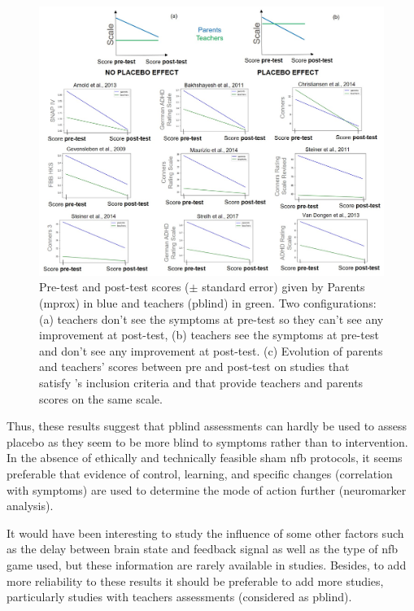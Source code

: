 \begin{figure}[h!]
  \centering
  \includegraphics[width=1.0\linewidth]{figures/discussion_on_placebo_effect_colors_2-columns_fitting_image}
  \caption{Pre-test and post-test scores ($\pm$ standard error) given by Parents (\gls{mprox}) in blue and teachers (\gls{pblind}) in green. Two configurations: (a) teachers don’t see the symptoms at 
	pre-test so they can’t see any improvement at post-test, (b) teachers see the symptoms at pre-test and don’t see any improvement at post-test. (c) Evolution of parents and teachers' scores
	between pre and post-test on studies that satisfy \citeauthor{Cortese2016}'s inclusion criteria and that provide teachers and parents scores on the same scale.}
  \label{Figure:discussion_on_placebo_effect_colors_2-columns_fitting_image}
\end{figure} 

Thus, these results suggest that \gls{pblind} assessments can hardly be used to assess placebo as they seem to be more blind
to symptoms rather than to intervention. In the absence of ethically and technically feasible sham \gls{nfb} protocols, it seems preferable 
that evidence of control, learning, and specific changes (correlation with symptoms) are used to determine the mode of action further 
(neuromarker analysis).      

It would have been interesting to study the influence of some other factors such as the delay between brain state and feedback 
signal as well as the type of \gls{nfb} game used, but these information are rarely available in studies. Besides, 
to add more reliability to these results it should be preferable to add more studies, 
particularly studies with teachers assessments (considered as \gls{pblind}). 

